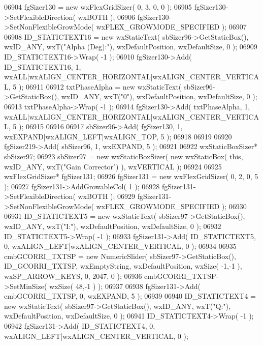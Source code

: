 \begin{DoxyCode}
06904     fgSizer130 = \textcolor{keyword}{new} wxFlexGridSizer( 0, 3, 0, 0 );
06905     fgSizer130->SetFlexibleDirection( wxBOTH );
06906     fgSizer130->SetNonFlexibleGrowMode( wxFLEX\_GROWMODE\_SPECIFIED );
06907     
06908     ID_STATICTEXT16 = \textcolor{keyword}{new} wxStaticText( sbSizer96->GetStaticBox(), wxID\_ANY, wxT(\textcolor{stringliteral}{"Alpha (Deg):"}), 
      wxDefaultPosition, wxDefaultSize, 0 );
06909     ID_STATICTEXT16->Wrap( -1 );
06910     fgSizer130->Add( ID_STATICTEXT16, 1, wxALL|wxALIGN\_CENTER\_HORIZONTAL|wxALIGN\_CENTER\_VERTICAL, 5 );
06911     
06912     txtPhaseAlpha = \textcolor{keyword}{new} wxStaticText( sbSizer96->GetStaticBox(), wxID\_ANY, wxT(\textcolor{stringliteral}{"0"}), wxDefaultPosition, 
      wxDefaultSize, 0 );
06913     txtPhaseAlpha->Wrap( -1 );
06914     fgSizer130->Add( txtPhaseAlpha, 1, wxALL|wxALIGN\_CENTER\_HORIZONTAL|wxALIGN\_CENTER\_VERTICAL, 5 );
06915     
06916     
06917     sbSizer96->Add( fgSizer130, 1, wxEXPAND|wxALIGN\_LEFT|wxALIGN\_TOP, 5 );
06918     
06919     
06920     fgSizer219->Add( sbSizer96, 1, wxEXPAND, 5 );
06921     
06922     wxStaticBoxSizer* sbSizer97;
06923     sbSizer97 = \textcolor{keyword}{new} wxStaticBoxSizer( \textcolor{keyword}{new} wxStaticBox( \textcolor{keyword}{this}, wxID\_ANY, wxT(\textcolor{stringliteral}{"Gain Corrector"}) ), wxVERTICAL 
      );
06924     
06925     wxFlexGridSizer* fgSizer131;
06926     fgSizer131 = \textcolor{keyword}{new} wxFlexGridSizer( 0, 2, 0, 5 );
06927     fgSizer131->AddGrowableCol( 1 );
06928     fgSizer131->SetFlexibleDirection( wxBOTH );
06929     fgSizer131->SetNonFlexibleGrowMode( wxFLEX\_GROWMODE\_SPECIFIED );
06930     
06931     ID_STATICTEXT5 = \textcolor{keyword}{new} wxStaticText( sbSizer97->GetStaticBox(), wxID\_ANY, wxT(\textcolor{stringliteral}{"I:"}), wxDefaultPosition, 
      wxDefaultSize, 0 );
06932     ID_STATICTEXT5->Wrap( -1 );
06933     fgSizer131->Add( ID_STATICTEXT5, 0, wxALIGN\_LEFT|wxALIGN\_CENTER\_VERTICAL, 0 );
06934     
06935     cmbGCORRI_TXTSP = \textcolor{keyword}{new} NumericSlider( sbSizer97->GetStaticBox(), 
      ID_GCORRI_TXTSP, wxEmptyString, wxDefaultPosition, wxSize( -1,-1 ), wxSP\_ARROW\_KEYS, 0, 2047, 0 );
06936     cmbGCORRI_TXTSP->SetMinSize( wxSize( 48,-1 ) );
06937     
06938     fgSizer131->Add( cmbGCORRI_TXTSP, 0, wxEXPAND, 5 );
06939     
06940     ID_STATICTEXT4 = \textcolor{keyword}{new} wxStaticText( sbSizer97->GetStaticBox(), wxID\_ANY, wxT(\textcolor{stringliteral}{"Q:"}), wxDefaultPosition, 
      wxDefaultSize, 0 );
06941     ID_STATICTEXT4->Wrap( -1 );
06942     fgSizer131->Add( ID_STATICTEXT4, 0, wxALIGN\_LEFT|wxALIGN\_CENTER\_VERTICAL, 0 );

\end{DoxyCode}
